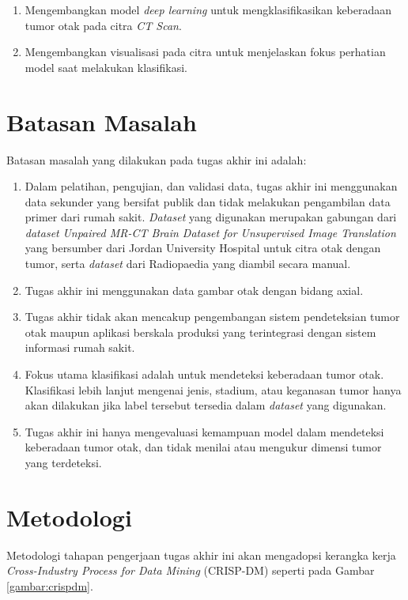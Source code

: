 \begin{enumerate}
	\item Mengembangkan model \textit{deep learning} untuk mengklasifikasikan keberadaan tumor otak pada citra \textit{CT Scan}.
	
	\item Mengembangkan visualisasi pada citra untuk menjelaskan fokus perhatian model saat melakukan klasifikasi. 
\end{enumerate}

\section{Batasan Masalah}
Batasan masalah yang dilakukan pada tugas akhir ini adalah:
\begin{enumerate}
	\item Dalam pelatihan, pengujian, dan validasi data, tugas akhir ini menggunakan data sekunder yang bersifat publik dan tidak melakukan pengambilan data primer dari rumah sakit. \textit{Dataset} yang digunakan merupakan gabungan dari \textit{dataset} \textit{Unpaired MR-CT Brain Dataset for Unsupervised Image Translation} \cite{AlKadi2022Unpaired} yang bersumber dari Jordan University Hospital untuk citra otak dengan tumor, serta \textit{dataset} dari Radiopaedia yang diambil secara manual.
	
	\item Tugas akhir ini menggunakan data gambar otak dengan bidang axial.
	
	\item	Tugas akhir tidak akan mencakup pengembangan sistem pendeteksian tumor otak maupun aplikasi berskala produksi yang terintegrasi dengan sistem informasi rumah sakit.
	
	\item	Fokus utama klasifikasi adalah untuk mendeteksi keberadaan tumor otak. Klasifikasi lebih lanjut mengenai jenis, stadium, atau keganasan tumor hanya akan dilakukan jika label tersebut tersedia dalam \textit{dataset} yang digunakan.
	
	\item Tugas akhir ini hanya mengevaluasi kemampuan model dalam mendeteksi keberadaan tumor otak, dan tidak menilai atau mengukur dimensi tumor yang terdeteksi.
	
\end{enumerate}

\section{Metodologi}
Metodologi tahapan pengerjaan tugas akhir ini akan mengadopsi kerangka kerja \textit{Cross-Industry Process for Data Mining} (CRISP-DM) seperti pada Gambar \ref{gambar:crispdm}.

